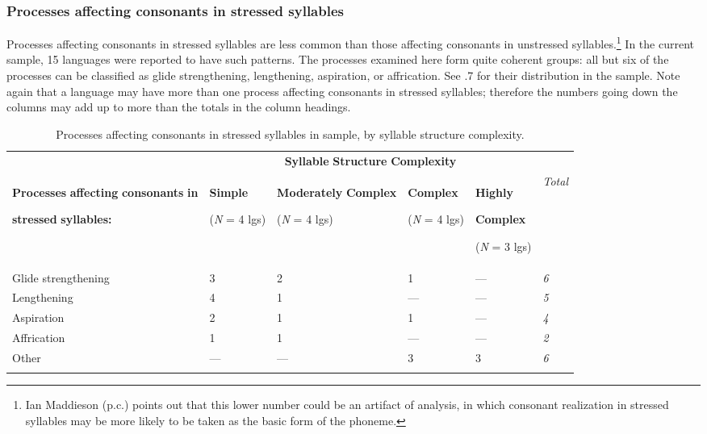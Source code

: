 \subsubsection{{Processes} {affecting} {consonants} {in} {stressed} {syllables}}\label{sec:5.4.3.3}

  Processes affecting consonants in stressed syllables are less common than those affecting consonants in unstressed syllables.\footnote{ \textrm{Ian Maddieson (p.c.) points out that this lower number could be an artifact of analysis, in which consonant realization in stressed syllables may be more likely to be taken as the basic form of the phoneme.}} In the current sample, 15 languages were reported to have such patterns. The processes examined here form quite coherent groups: all but six of the processes can be classified as glide strengthening, lengthening, aspiration, or affrication. See .7 for their distribution in the sample. Note again that a language may have more than one process affecting consonants in stressed syllables; therefore the numbers going down the columns may add up to more than the totals in the column headings.

\begin{table}
\begin{tabularx}{\textwidth}{XXXXXX}
\lsptoprule
 & \multicolumn{4}{c}{ \textbf{Syllable} \textbf{Structure} \textbf{Complexity}} & \\
{ \textbf{Processes} \textbf{affecting} \textbf{consonants} \textbf{in} }

 \textbf{stressed} \textbf{syllables:} & { \textbf{Simple}}

 (\textit{N} = 4 lgs) & { \textbf{Moderately} \textbf{Complex}}

 (\textit{N} = 4 lgs) & { \textbf{Complex}}

 (\textit{N} = 4 lgs) & { \textbf{Highly} }

{ \textbf{Complex}}

 (\textit{N} = 3 lgs) & \textit{Total}\\
 Glide strengthening & 3 & 2 & 1 & — & \textit{6}\\
 Lengthening & 4 & 1 & — & — & \textit{5}\\
 Aspiration & 2 & 1 & 1 & — & \textit{4}\\
 Affrication & 1 & 1 & — & — & \textit{2}\\
 Other & — & — & 3 & 3 & \textit{6}\\
\lspbottomrule
\end{tabularx}
\caption{\label{5.7}Processes affecting consonants in stressed syllables in sample, by syllable structure complexity.}
\end{table}

